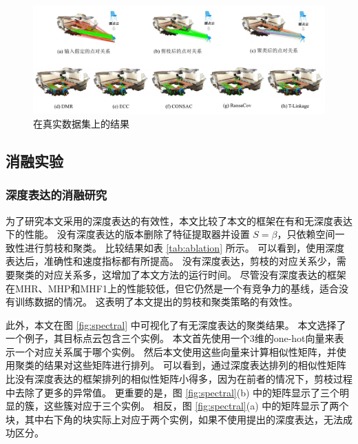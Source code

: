 \begin{figure}
        \centering
        \includegraphics[width=1.0\textwidth]{images/DMR_real.pdf}
        \caption{
          在真实数据集上的结果
        }
        \label{fig:DMR_real}
\end{figure}
      
\subsection{消融实验}
\label{sec:ablation}
\subsubsection{深度表达的消融研究}为了研究本文采用的深度表达的有效性，本文比较了本文的框架在有和无深度表达下的性能。
没有深度表达的版本删除了特征提取器并设置 $S=\beta$，只依赖空间一致性进行剪枝和聚类。
比较结果如表 \ref{tab:ablation} 所示。
可以看到，使用深度表达后，准确性和速度指标都有所提高。
没有深度表达，剪枝的对应关系少，需要聚类的对应关系多，这增加了本文方法的运行时间。
尽管没有深度表达的框架在MHR、MHP和MHF1上的性能较低，但它仍然是一个有竞争力的基线，适合没有训练数据的情况。
这表明了本文提出的剪枝和聚类策略的有效性。

此外，本文在图 \ref{fig:spectral} 中可视化了有无深度表达的聚类结果。
本文选择了一个例子，其目标点云包含三个实例。
本文首先使用一个3维的one-hot向量来表示一个对应关系属于哪个实例。
然后本文使用这些向量来计算相似性矩阵，并使用聚类的结果对这些矩阵进行排列。
可以看到，通过深度表达排列的相似性矩阵比没有深度表达的框架排列的相似性矩阵小得多，因为在前者的情况下，剪枝过程中去除了更多的异常值。
更重要的是，图 \ref{fig:spectral}(b) 中的矩阵显示了三个明显的簇，这些簇对应于三个实例。
相反，图 \ref{fig:spectral}(a) 中的矩阵显示了两个块，其中右下角的块实际上对应于两个实例，如果不使用提出的深度表达，无法成功区分。

